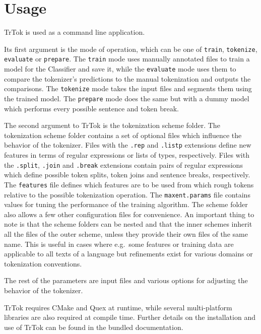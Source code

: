 \section{Usage}
\label{sec:usage}

TrTok is used as a command line application.

Its first argument is the mode of operation, which can be one of
\texttt{train}, \texttt{tokenize}, \texttt{evaluate} or
\texttt{prepare}. The \texttt{train} mode uses manually annotated
files to train a model for the Classifier and save it, while the
\texttt{evaluate} mode uses them to compare the tokenizer's
predictions to the manual tokenization and outputs the comparisons.
The \texttt{tokenize} mode takes the input files and segments them
using the trained model. The \texttt{prepare} mode does the same but
with a dummy model which performs every possible sentence and token
break.

The second argument to TrTok is the tokenization scheme folder. The
tokenization scheme folder contains a set of optional files which
influence the behavior of the tokenizer. Files with the \texttt{.rep}
and \texttt{.listp} extensions define new features in terms of regular
expressions or lists of types, respectively. Files with the
\texttt{.split}, \texttt{.join} and \texttt{.break} extensions contain
pairs of regular expressions which define possible token splits, token
joins and sentence breaks, respectively. The \texttt{features} file
defines which features are to be used from which rough tokens relative
to the possible tokenization operation. The \texttt{maxent.params}
file contains values for tuning the performance of the training
algorithm. The scheme folder also allows a few other configuration
files for convenience. An important thing to note is that the scheme
folders can be nested and that the inner schemes inherit all the files
of the outer scheme, unless they provide their own files of the same
name. This is useful in cases where e.g.\ some features or training
data are applicable to all texts of a language but refinements exist
for various domains or tokenization conventions.

The rest of the parameters are input files and various options for
adjusting the behavior of the tokenizer.

TrTok requires CMake and Quex at runtime, while several multi-platform
libraries are also required at compile time. Further details on the
installation and use of TrTok can be found in the bundled
documentation.
